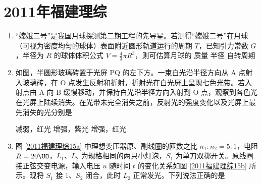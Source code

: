 \documentclass[\gkver]{gaokaozhenti}
\begin{document}
\chapter{2011年福建理综}

\begin{enumerate}
\item
“嫦娥二号”是我国月球探测第二期工程的先导星。若测得“嫦娥二号”在月球（可视为密度均匀的球体）表面附近圆形轨道运行的周期 $T$，已知引力常数 $G$，半径为 $R$ 的球体体积公式 $V=\frac{4}{3}\pi R^{3}$，则可估算月球的
{质量}
{半径}
{自转周期}

\item
如图，半圆形玻璃砖置于光屏 PQ 的左下方。一束白光沿半径方向从 A 点射入玻璃砖，在 O 点发生反射和折射，折射光在白光屏上呈现七色光带。若入射点由 A 向 B 缓慢移动，并保持白光沿半径方向入射到 O 点，观察到各色光在光屏上陆续消失。在光带未完全消失之前，反射光的强度变化以及光屏上最先消失的光分别是


{减弱，红光}
{增强，紫光}
{增强，红光}

\item
图 \ref{2011福建理综15a} 中理想变压器原、副线圈的匝数之比 $n_{1}:n_{2}=5:1$，电阻 $R=20\UO$，$L_{1}$、$L_{2}$ 为规格相同的两只小灯泡，$S_{1}$ 为单刀双掷开关。原线圈接正弦交变电源，输入电压 $u$ 随时间 $t$ 的变化关系如图 \ref{2011福建理综15b} 所示。现将 $S_{1}$ 接 1、$S_{2}$ 闭合，此时 $L_{2}$ 正常发光。下列说法正确的是


\end{enumerate}
\end{document}
